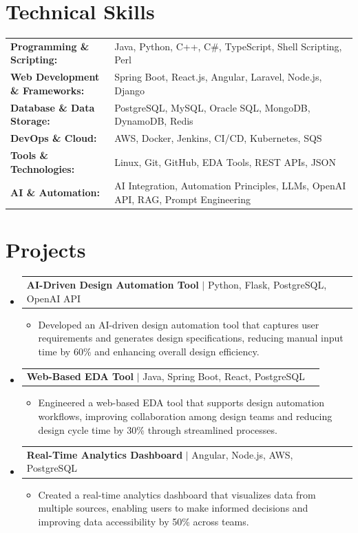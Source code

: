 \documentclass[letterpaper,10pt]{article}
\makeatletter
\newcommand{\resumeItem}[1]{
  \item{\fontsize{8pt}{9pt}\selectfont
    #1 \vspace{-3pt}
  }
}
\newcommand{\resumeProjectHeading}[2]{
    \item
    \begin{tabular*}{1.001\textwidth}{l@{\extracolsep{\fill}}r}
      \fontsize{8.5pt}{10pt}#1 & \textbf{\fontsize{8.5pt}{10pt} #2}\\
    \end{tabular*}\vspace{-7pt}
}
\newcommand{\resumeSubHeadingListStart}{\begin{itemize}[leftmargin=0pt, label={}]}
\newcommand{\resumeSubHeadingListEnd}{\end{itemize}}
\newcommand{\resumeItemListStart}{\begin{itemize}[leftmargin=*]}
\newcommand{\resumeItemListEnd}{\end{itemize}\vspace{-5pt}}
\makeatother
\begin{document}
\section{Technical Skills}
        \vspace{-14pt}
        \begin{table}[h]
            \fontsize{8pt}{9pt}\selectfont
            \begin{tabular}{p{0.3\linewidth} p{0.7\linewidth}}
                \textbf{Programming \& Scripting:} & Java, Python, C++, C\#, TypeScript, Shell Scripting, Perl \\
                \textbf{Web Development \& Frameworks:} & Spring Boot, React.js, Angular, Laravel, Node.js, Django \\
                \textbf{Database \& Data Storage:} & PostgreSQL, MySQL, Oracle SQL, MongoDB, DynamoDB, Redis \\
                \textbf{DevOps \& Cloud:} & AWS, Docker, Jenkins, CI/CD, Kubernetes, SQS \\
                \textbf{Tools \& Technologies:} & Linux, Git, GitHub, EDA Tools, REST APIs, JSON \\
                \textbf{AI \& Automation:} & AI Integration, Automation Principles, LLMs, OpenAI API, RAG, Prompt Engineering \\
            \end{tabular}
        \end{table}
 \vspace{-18pt}

\section{Projects}
    \vspace{-5pt}
    \resumeSubHeadingListStart
          \resumeProjectHeading
            {\textbf{AI-Driven Design Automation Tool} $|$ Python, Flask, PostgreSQL, OpenAI API}{}
            \resumeItemListStart
                \resumeItem{Developed an AI-driven design automation tool that captures user requirements and generates design specifications, reducing manual input time by 60\% and enhancing overall design efficiency.}
            \resumeItemListEnd
        \vspace{-12pt}
    
        \resumeProjectHeading
            {\textbf{Web-Based EDA Tool} $|$ Java, Spring Boot, React, PostgreSQL}{}
        \resumeItemListStart
                \resumeItem{Engineered a web-based EDA tool that supports design automation workflows, improving collaboration among design teams and reducing design cycle time by 30\% through streamlined processes.}
        \resumeItemListEnd
      \vspace{-12pt}
      \resumeProjectHeading
        {\textbf{Real-Time Analytics Dashboard} $|$ Angular, Node.js, AWS, PostgreSQL}{}
    \resumeItemListStart
            \resumeItem{Created a real-time analytics dashboard that visualizes data from multiple sources, enabling users to make informed decisions and improving data accessibility by 50\% across teams.}
    \resumeItemListEnd
    \resumeSubHeadingListEnd
\end{document}
